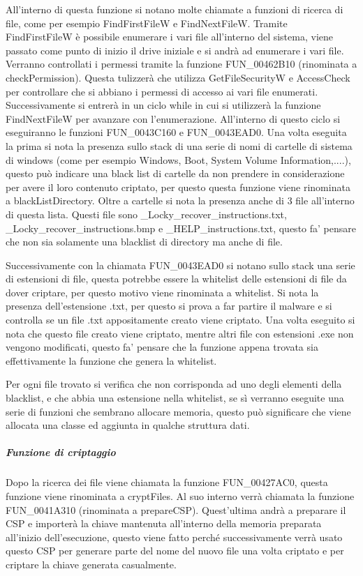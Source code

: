 \documentclass[a4paper,12pt]{article}
\begin{document}
All'interno di questa funzione si notano molte chiamate a funzioni di ricerca di file, come per esempio FindFirstFileW e FindNextFileW. Tramite FindFirstFileW è possibile enumerare i vari file all'interno del sistema, viene passato come punto di inizio il drive iniziale e si andrà ad enumerare i vari file. Verranno controllati i permessi tramite la funzione FUN\_00462B10 (rinominata a checkPermission). Questa tulizzerà che utilizza GetFileSecurityW e AccessCheck per controllare che si abbiano i permessi di accesso ai vari file enumerati. Successivamente si entrerà in un ciclo while in cui si utilizzerà la funzione FindNextFileW per avanzare con l'enumerazione. All'interno di questo ciclo si eseguiranno le funzioni FUN\_0043C160 e FUN\_0043EAD0. Una volta eseguita la prima si nota la presenza sullo stack di una serie di nomi di cartelle di sistema di windows (come per esempio Windows, Boot, System Volume Information,....), questo può indicare una black list di cartelle da non prendere in considerazione per avere il loro contenuto criptato, per questo questa funzione viene rinominata a blackListDirectory. Oltre a cartelle si nota la presenza anche di 3 file all'interno di questa lista. Questi file sono \_Locky\_recover\_instructions.txt, \_Locky\_recover\_instructions.bmp e \_HELP\_instructions.txt, questo fa' pensare che non sia solamente una blacklist di directory ma anche di file.

 Successivamente con la chiamata FUN\_0043EAD0 si notano sullo stack una serie di estensioni di file, questa potrebbe essere la whitelist delle estensioni di file da dover criptare, per questo motivo viene rinominata a whitelist. Si nota la presenza dell'estensione .txt, per questo si prova a far partire il malware e si controlla se un file .txt appositamente creato viene criptato. Una volta eseguito si nota che questo file creato viene criptato, mentre altri file con estensioni .exe non vengono modificati, questo fa' pensare che la funzione appena trovata sia effettivamente la funzione che genera la whitelist. 

Per ogni file trovato si verifica che non corrisponda ad uno degli elementi della blacklist, e che abbia una estensione nella whitelist, se sì verranno eseguite una serie di funzioni che sembrano allocare memoria, questo può significare che viene allocata una classe ed aggiunta in qualche struttura dati. 

\subparagraph{Funzione di criptaggio}
Dopo la ricerca dei file viene chiamata la funzione FUN\_00427AC0, questa funzione viene rinominata a cryptFiles. Al suo interno verrà chiamata la funzione FUN\_0041A310 (rinominata a prepareCSP). Quest'ultima andrà a preparare il CSP e importerà la chiave mantenuta all'interno della memoria preparata all'inizio dell'esecuzione, questo viene fatto perché successivamente verrà usato questo CSP per generare parte del nome del nuovo file una volta criptato e per criptare la chiave generata casualmente.
\end{document}
